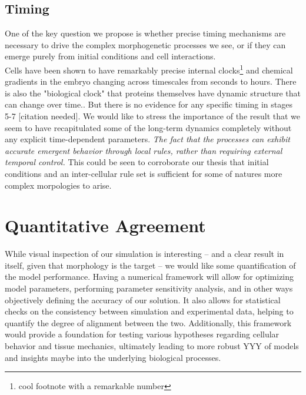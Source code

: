 

\subsection{Timing}
One of the key question we propose is whether precise timing mechanisms are necessary to drive the complex morphogenetic processes we see, or if they can emerge purely from initial conditions and cell interactions.\\
Cells have been shown to have remarkably precise internal clocks\footnote{cool footnote with a remarkable number\cite{cellinternal}} and chemical gradients in the embryo changing across timescales from seconds to hours\cite{shvartsman2008dynamics}. There is also the "biological clock"\cite{johanolsen2} that proteins themselves have dynamic structure that can change over time.\cite{johanolsen1}. But there is no evidence for any specific timing in stages 5-7 [citation needed]. We would like to stress the importance of the result that we seem to have recapitulated some of the long-term dynamics completely without any explicit time-dependent parameters. \textit{The fact  that the processes can exhibit accurate emergent behavior through local rules, rather than requiring external temporal control. }This could be seen to corroborate our thesis that initial conditions and an inter-cellular rule set is sufficient for some of natures more complex morpologies to arise. 

\section{Quantitative Agreement}

While visual inspection of our simulation is interesting -- and a clear result in itself, given that morphology is the target -- we would like some quantification of the model performance. Having a numerical framework will allow for optimizing model parameters, performing parameter sensitivity analysis, and in other ways objectively defining the accuracy of our solution. It also allows for statistical checks on the consistency between simulation and experimental data, helping to quantify the degree of alignment between the two. Additionally, this framework would provide a foundation for testing various hypotheses regarding cellular behavior and tissue mechanics, ultimately leading to more robust YYY of models and insights maybe into the underlying biological processes.\\


